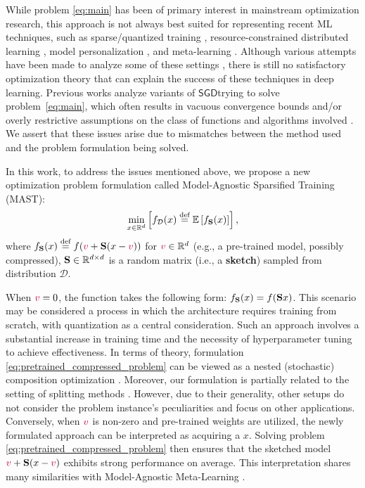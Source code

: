 \documentclass{article}
\newcommand{\shift}{{\color{purple}s}}
\newcommand{\SGD}{$\mathsf{SGD}$}
\newcommand{\bb}{\mathbb}
\newcommand{\R}{\bb R}
\newcommand{\cD}{\mathcal{D}}
\newcommand{\eqdef}{\stackrel{\text{def}}{=}}
\newcommand{\Exp}[1]{{\bb E}\left[#1\right]}
\theoremstyle{plain}
\newcommand{\tf}{f_{\mathcal{D}}}
\renewcommand{\shift}{{\color{purple}v}}
\newcommand{\mS}{{\bf S}}
\theoremstyle{plain}
\theoremstyle{definition}
\theoremstyle{remark}
\begin{document}
While problem \eqref{eq:main} has been of primary interest in mainstream optimization research, this approach is not always best suited for representing recent ML techniques, such as sparse/quantized training \citep{wu2016quantized, hoefler2021sparsity},
resource-constrained distributed learning \citep{caldas2018expanding, wang2018edge}, model personalization \citep{smith2017federated, hanzely2020federated, mansour2020three}, and meta-learning \citep{schmidhuber1987evolutionary, finn2017model}.
Although various attempts have been made to analyze some of these settings \citep{khaled2019gradient, lin2019dynamic, mohtashami2022masked}, there is still no satisfactory optimization theory that can explain the success of these techniques in deep learning. Previous works analyze variants of \SGD\text{ }trying to solve problem~\eqref{eq:main}, which often results in vacuous convergence bounds and/or overly restrictive assumptions on the class of functions and algorithms involved \citep{shulgin2023towards}. We assert that these issues arise due to mismatches between the method used and the problem formulation being solved.

In this work, to address the issues mentioned above, we propose a new optimization problem formulation called Model-Agnostic Sparsified Training (MAST):
\begin{equation}\label{eq:pretrained_compressed_problem}
	\min_{x\in \R^d} \left[ \tf(x) \eqdef \Exp{f_{\mS}(x)}\right],
\end{equation}
where $f_{\mS}(x)\eqdef f(\shift +\mS (x-\shift))$ for $\shift\in \R^d$ (e.g., a pre-trained model, possibly compressed), $\mS \in \R^{d \times d}$ is a random matrix (i.e., a \textbf{sketch}) sampled from distribution $\cD$.

When $\shift = 0$, the function takes the following form: $f_{\mS}(x) = f(\mS x)$. This scenario may be considered a process in which the architecture requires training from scratch, with quantization as a central consideration. Such an approach involves a substantial increase in training time and the necessity of hyperparameter tuning to achieve effectiveness.
In terms of theory, formulation \eqref{eq:pretrained_compressed_problem} can be viewed as a nested (stochastic) composition optimization \citep{bertsekas1977approximation, poljak1979bertsekas, ermoliev1988stochastic}.
Moreover, our formulation is partially related to the setting of splitting methods \citep{condat2023proximal}.
However, due to their generality, other setups do not consider the problem instance's peculiarities and focus on other applications. Conversely, when $\shift$ is non-zero and pre-trained weights are utilized, the newly formulated approach can be interpreted as acquiring a  $x$. Solving problem \eqref{eq:pretrained_compressed_problem} then ensures that the sketched model $\shift + \mS(x - \shift)$ exhibits strong performance on average.
This interpretation shares many similarities with Model-Agnostic Meta-Learning \citep{finn2017model}.
\end{document}
